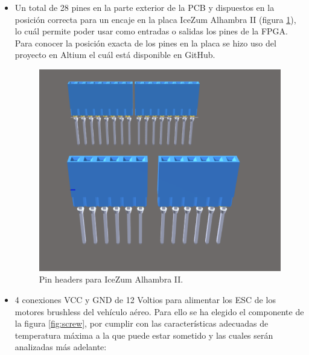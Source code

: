 \begin{itemize}
	\item Un total de 28 pines en la parte exterior de la PCB y dispuestos en la posición correcta para un encaje en la placa IceZum Alhambra II (figura \ref{fig:pin_headers}), lo cuál permite poder usar como entradas o salidas los pines de la FPGA. Para conocer la posición exacta de los pines en la placa se hizo uso del proyecto en Altium el cuál está disponible en GitHub.
	
	\begin{figure}[H]
		\center
		\includegraphics[scale=0.5]{imagenes/Balancing_robot/pin_headers.PNG}
		\caption{Pin headers para IceZum Alhambra II.}
		\label{fig:pin_headers}
	\end{figure}
	
	
	\item 4 conexiones VCC y GND de 12 Voltios para alimentar los ESC de los motores brushless del vehículo aéreo. Para ello se ha elegido el componente de la figura \ref{fig:screw}, por cumplir con las características adecuadas de temperatura máxima a la que puede estar sometido y las cuales serán analizadas más adelante: 
	

\end{itemize}
